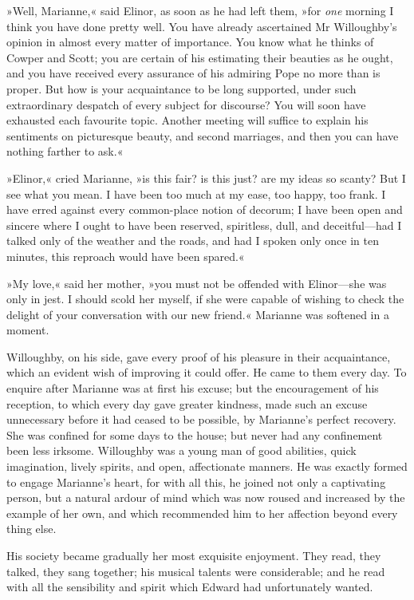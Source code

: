 »Well, Marianne,« said Elinor, as soon as he had left them, »for \textit{one} morning I think you have done pretty well. You have already ascertained Mr Willoughby’s opinion in almost every matter of importance. You know what he thinks of Cowper and Scott; you are certain of his estimating their beauties as he ought, and you have received every assurance of his admiring Pope no more than is proper. But how is your acquaintance to be long supported, under such extraordinary despatch of every subject for discourse? You will soon have exhausted each favourite topic. Another meeting will suffice to explain his sentiments on picturesque beauty, and second marriages, and then you can have nothing farther to ask.«

»Elinor,« cried Marianne, »is this fair? is this just? are my ideas so scanty? But I see what you mean. I have been too much at my ease, too happy, too frank. I have erred against every common-place notion of decorum; I have been open and sincere where I ought to have been reserved, spiritless, dull, and deceitful—had I talked only of the weather and the roads, and had I spoken only once in ten minutes, this reproach would have been spared.«

»My love,« said her mother, »you must not be offended with Elinor—she was only in jest. I should scold her myself, if she were capable of wishing to check the delight of your conversation with our new friend.« Marianne was softened in a moment.

Willoughby, on his side, gave every proof of his pleasure in their acquaintance, which an evident wish of improving it could offer. He came to them every day. To enquire after Marianne was at first his excuse; but the encouragement of his reception, to which every day gave greater kindness, made such an excuse unnecessary before it had ceased to be possible, by Marianne’s perfect recovery. She was confined for some days to the house; but never had any confinement been less irksome. Willoughby was a young man of good abilities, quick imagination, lively spirits, and open, affectionate manners. He was exactly formed to engage Marianne’s heart, for with all this, he joined not only a captivating person, but a natural ardour of mind which was now roused and increased by the example of her own, and which recommended him to her affection beyond every thing else.

His society became gradually her most exquisite enjoyment. They read, they talked, they sang together; his musical talents were considerable; and he read with all the sensibility and spirit which Edward had unfortunately wanted.

